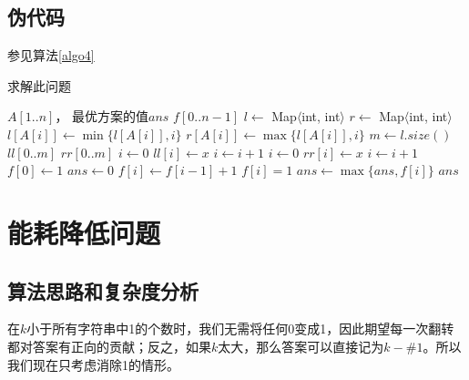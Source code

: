 \documentclass[UTF8]{ctexart}
\begin{document}
    \subsection*{伪代码}
        参见算法\ref{algo4}
        \begin{algorithm}
            \caption{求解此问题}
            \begin{algorithmic}[1]
                \Require $A[1..n]$，
                \Ensure 最优方案的值$ans$
                    \State $f[0..n-1]$
                    \State $l \gets$ Map$\langle$int, int$\rangle$
                    \State $r \gets$ Map$\langle$int, int$\rangle$
                        \State $l[A[i]]\gets \min{\{l[A[i]], i\}}$
                        \State $r[A[i]]\gets \max{\{l[A[i]], i\}}$
                    \EndFor
                    \State $m \gets l.size()$
                    \State $ll[0..m]$
                    \State $rr[0..m]$
                    \State $i \gets 0$
                        \State $ll[i]\gets x$
                        \State $i \gets i+1$
                    \EndFor
                    \State $i \gets 0$
                        \State $rr[i]\gets x$
                        \State $i \gets i+1$
                    \EndFor
                    \State $f[0] \gets 1$
                    \State $ans \gets 0$
                            \State $f[i] \gets f[i-1]+1$
                        \Else
                            \State $f[i] = 1$
                        \EndIf
                        \State $ans \gets \max{\{ans, f[i]\}}$
                    \EndFor
                    \State \Return $ans$
                \EndFunction
            \end{algorithmic}
            \label{algo4}
        \end{algorithm}

\section{能耗降低问题}
    \subsection*{算法思路和复杂度分析}
        在$k$小于所有字符串中1的个数时，我们无需将任何0变成1，因此期望每一次翻转都对答案有正向的贡献；反之，如果$k$太大，那么答案可以直接记为$k-\#1$。所以我们现在只考虑消除1的情形。
        
\end{document}
